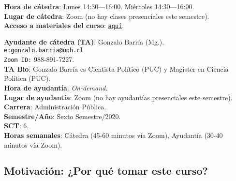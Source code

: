 \documentclass[letterpaper]{article}
\begin{document}
\vspace{5mm}
{\bf Hora de c\'atedra}: Lunes 14:30---16:00. Mi\'ercoles 14:30---16:00.\\
{\bf Lugar de c\'atedra}: Zoom (no hay clases presenciales este semestre).\\

{\bf Acceso a materiales del curso}: \href{https://ucampus.uoh.cl/uoh/2020/2/APU3602/1/}{\texttt{aqu\'i}}.

\vspace{5mm}
{\bf Ayudante de c\'atedra (TA)}: Gonzalo Barr\'ia (Mg.).\\
\texttt{e:}\href{mailto:gonzalo.barria@uoh.cl}{\texttt{gonzalo.barria@uoh.cl}}\\
\texttt{Zoom ID:} 988-891-7227.\\
{\bf TA Bio}: Gonzalo Barr\'ia es Cientista Pol\'itico (PUC) y Mag\'ister en Ciencia Pol\'itica (PUC).\\
{\bf Hora de ayudant\'ia}: \emph{On-demand}.\\
{\bf Lugar de ayudant\'ia}: Zoom (no hay ayudant\'ias presenciales este semestre).\\


\vspace{5mm}
{\bf Carrera}:  Administraci\'on P\'ublica.\\
{\bf Semestre/A\~no}: Sexto Semestre/2020.\\
{\bf SCT}: 6.\\
{\bf Horas semanales}: C\'atedra (45-60 minutos v\'ia Zoom), Ayudant\'ia  (30-40 minutos v\'ia Zoom).



\subsection*{Motivaci\'on: ¿Por qu\'e tomar este curso?}
\end{document}

